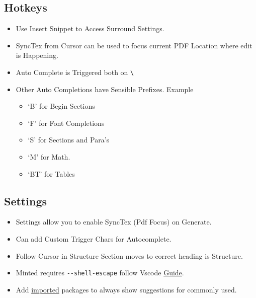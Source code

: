 \documentclass{report}[a4paper,12pt] %
\begin{document}
\subsection{Hotkeys}
\begin{itemize}
  \item Use Insert Snippet to Access Surround Settings.
  \item SyncTex from Cursor can be used to focus current PDF Location where edit is Happening.
  \item Auto Complete is Triggered both on \verb|\|
  \item Other Auto Completions have Sensible Prefixes. Example
  \begin{itemize}
    \item `B' for Begin Sections
    \item `F' for Font Completions
    \item `S' for Sections and Para's
    \item `M' for Math.
    \item `BT' for Tables
  \end{itemize}
\end{itemize}

\subsection{Settings}
\begin{itemize}
  \item Settings allow you to enable SyncTex (Pdf Focus) on Generate.
  \item Can add Custom Trigger Chars for Autocomplete.
  \item Follow Cursor in Structure Section moves to correct heading is Structure.
  \item Minted requires \verb|--shell-escape| follow Vscode \href{https://leportella.com/minted-vscode/}{Guide}.
  \item Add \href{https://www.reddit.com/r/LaTeX/comments/pwkopy/subfile_autocompletion_in_vs_code/}{imported} packages to always show suggestions for commonly used.
\end{itemize}
\end{document}
